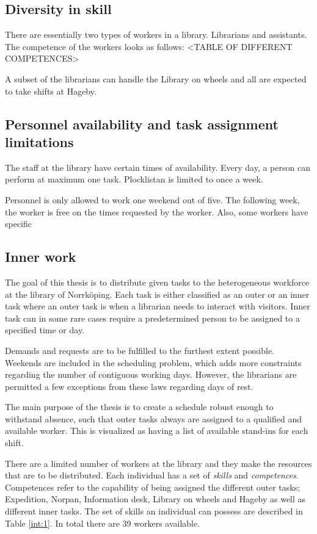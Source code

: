 \subsection{Diversity in skill}
There are essentially two types of workers in a library. Librarians and assistants. The competence of the workers looks as follows: <TABLE OF DIFFERENT COMPETENCES>

A subset of the librarians can handle the Library on wheels and all are expected to take shifts at Hageby.

\subsection{Personnel availability and task assignment limitations}
The staff at the library have certain times of availability. Every day, a person can perform at maximum one task. Plocklistan is limited to once a week.

Personnel is only allowed to work one weekend out of five. The following week, the worker is free on the times requested by the worker. Also, some workers have specific 

\subsection{Inner work} 

The goal of this thesis is to distribute given tasks to the heterogeneous workforce at the library of Norrköping. Each task is either classified as an outer or an inner task where an outer task is when a librarian needs to interact with visitors. Inner task can in some rare cases require a predetermined person to be assigned to a specified time or day.

Demands and requests are to be fulfilled to the furthest extent possible. Weekends are included in the scheduling problem, which adds more constraints regarding the number of contiguous working days. However, the librarians are permitted a few exceptions from these laws regarding days of rest.

The main purpose of the thesis is to create a schedule robust enough to withstand absence, such that outer tasks always are assigned to a qualified and available worker. This is visualized as having a list of available stand-ins for each shift. 

There are a limited number of workers at the library and they make the resources that are to be distributed. Each individual has a set of \textit{skills} and \textit{competences}. Competences refer to the capability of being assigned the different outer tasks; Expedition, Norpan, Information desk, Library on wheels and Hageby as well as different inner tasks. The set of skills an individual can possess are described in Table \ref{int:1}. In total there are 39 workers available.


